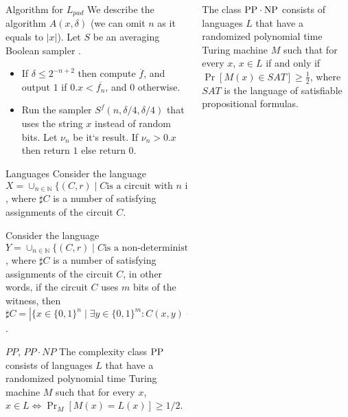 \begin{frame}{}
\begin{columns}[t]
\begin{column}{0.32\linewidth}
\begin{block}{Algorithm for $L_{pad}$}
            We describe the algorithm $A(x,\delta)$  (we can omit $n$ as it equals to $|x|$).
			Let $S$ be an averaging Boolean sampler \cite{Gol11}.
            \begin{itemize}
				\item If $\delta \le 2^{-n+2}$ then compute $\overline{f}$, and
		            output $1$ if $0.x < \overline{f_n}$, and $0$ otherwise. 
				\item Run the sampler $S^f(n, \delta / 4, \delta / 4)$ that uses the
		            string $x$ instead of random bits.
					Let $\nu_n$ be it`s result. If $\nu_n> 0.x$ then return $1$ else
                    return $0$. 
			\end{itemize}
        \end{block}

        \begin{block}{Languages}
            Consider the language $X = \cup_{n \in \mathbb{N}}\{(C, r) \mid \mbox{$C$
            is a circuit with $n$ inputs}, r \in \{0, 1\}^n, \sharp C > r\}$, where
        	$\sharp C$ is a number of satisfying assignments of the circuit $C$. 

            Consider the language $Y = \cup_{n \in \mathbb{N}}\{(C,r) \mid \mbox{$C$
            is a non-deterministic circuit with $n$ inputs}, r \in \{0, 1\}^n, \sharp
          	C > r\}$, where $\sharp C$ is a number of satisfying assignments of the
            circuit $C$, in other words, if the circuit $C$ uses $m$ bits of the
            witness, then $\sharp C = |\{x \in \{0,1\}^n \mid \exists y \in
            \{0,1\}^m: C(x,y) = 1\}|$.
        \end{block}

        \begin{block}{$PP$, $PP \cdot NP$}
            The complexity class $\rm PP$ consists of languages $L$ that 
            have a randomized polynomial time Turing machine $M$ such that for every
            $x$, $x \in L \iff \Pr_M[M(x) = L(x)] \ge 1 / 2$.
        \end{block}
    \end{column}%

    \begin{column}{0.32\linewidth}
        

            The class $\rm PP \cdot NP$ consists of languages $L$ that have a
			randomized polynomial time Turing machine $M$ such that for every $x$,
            $x \in L$ if and only if $\Pr[M(x)\in SAT]\ge \frac12$, where $SAT$ is
            the language of satisfiable propositional formulas.


\end{column}
\end{columns}
\end{frame}
